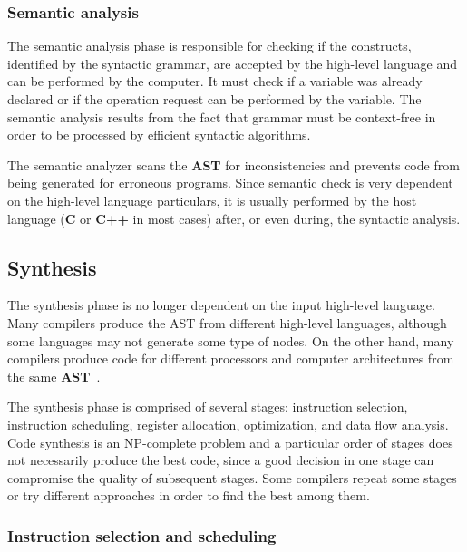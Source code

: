 \subsubsection{Semantic analysis}

The semantic analysis phase is responsible for checking if the constructs,
identified by the syntactic grammar, are accepted by the high-level language
and can be performed by the computer.  It must check if a variable was already
declared or if the operation request can be performed by the variable.  The
semantic analysis results from the fact that grammar must be context-free in
order to be processed by efficient syntactic algorithms.

The semantic analyzer scans the {\bf AST} for inconsistencies and prevents code
from being generated for erroneous programs.  Since semantic check is very
dependent on the high-level language particulars, it is usually performed by the
host language ({\bf C} or {\bf C++} in most cases) after, or even during, the
syntactic analysis.

\subsection{Synthesis}

The synthesis phase is no longer dependent on the input high-level language.
Many compilers produce the {\sc AST} from different high-level languages,
although some languages may not generate some type of nodes.  On the other hand,
many compilers produce code for different processors and computer architectures
from the same {\bf AST}~\cite{hanson95}.

The synthesis phase is comprised of several stages: instruction selection,
instruction scheduling, register allocation, optimization, and data flow
analysis.  Code synthesis is an NP-complete problem and a particular order of
stages does not necessarily produce the best code, since a good decision in one
stage can compromise the quality of subsequent stages.  Some compilers repeat
some stages or try different approaches in order to find the best among them.


\subsubsection{Instruction selection and scheduling}\label{burg}

